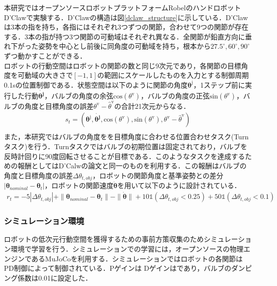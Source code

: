 \documentclass[dvipdfmx]{ampbt_nomag}
\begin{document}
本研究ではオープンソースロボットプラットフォームRobelのハンドロボットD'Clawで実験する\cite{ahn2020robel}．D'Clawの構造は図\ref{dclaw_structure}に示している．D'Clawは3本の指を持ち，各指にはそれぞれ3つずつの関節，合わせて9つの関節が存在する．3本の指が持つ3つ関節の可動域はそれぞれ異なる．全関節が鉛直方向に垂れ下がった姿勢を中心とし前後に同角度の可動域を持ち，根本から$27.5^\circ,60^\circ,90^\circ$ずつ動かすことができる．\\
ロボットの行動空間はロボットの関節の数と同じ9次元であり，各関節の目標角度を可動域の大きさで$[-1,1]$の範囲にスケールしたものを入力とする制御周期0.1sの位置制御である．状態空間は以下のように関節の角度$\boldsymbol{\theta}^{\textrm{j}}$，1ステップ前に実行した行動$\dot{\boldsymbol{\theta^{\textrm{j}}}}$，バルブの角度の余弦$\textrm{cos}(\theta^{\textrm{v}})$，バルブの角度の正弦$\textrm{sin}(\theta^{\textrm{v}})$，バルブの角度と目標角度の誤差$\theta^{\textrm{v}} - \hat{\theta}^{\textrm{v}}$の合計21次元からなる．\\
\begin{eqnarray}\label{state}
  s_t = \left(\boldsymbol{\theta}^{\textrm{j}},\dot{\boldsymbol{\theta^{\textrm{j}}}},\textrm{cos}(\theta^{\textrm{v}}),\textrm{sin}(\theta^{\textrm{v}}),\theta^{\textrm{v}} - \hat{\theta}^{\textrm{v}}\right) \nonumber \\ 
\end{eqnarray}
また，本研究ではバルブの角度をを目標角度に合わせる位置合わせタスク(Turnタスク)を行う．Turnタスクではバルブの初期位置は固定されており，バルブを反時計回りに90度回転させることが目標である．このようなタスクを達成するための報酬としてはD'Calwの論文と同一のものを利用する．この報酬はバルブの角度と目標角度の誤差$\Delta\theta_{t,obj}$，ロボットの関節角度と基準姿勢との差分$|\boldsymbol{\theta}_{nominal}-\boldsymbol{\theta}_t|$，ロボットの関節速度$\dot{\boldsymbol{\theta}}$を用いて以下のように設計されている．\\
\begin{eqnarray}\label{reward}
  r_t = −5|\Delta\theta_{t,obj}| + \|\boldsymbol{\theta}_{nominal}-\boldsymbol{\theta}_t\| -\|\dot{\boldsymbol{\theta}}\| + 10\mathds{1}(\Delta\theta_{t,obj} < 0.25) + 50\mathds{1}(\Delta\theta_{t,obj} < 0.1)
\end{eqnarray}

\subsubsection{シミュレーション環境}
ロボットの低次元行動空間を獲得するための事前方策収集のためシミュレーション環境で学習を行う．シミュレーションでの学習には，オープンソースの物理エンジンであるMuJoCoを利用する\cite{Mujoco}．シミュレーションではロボットの各関節はPD制御によって制御されている．Pゲインは Dゲインはであり，バルブのダンピング係数は0.01に設定した．
\end{document}

